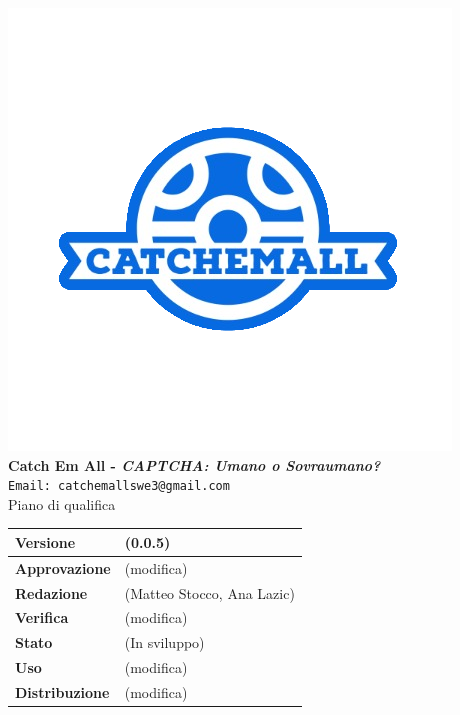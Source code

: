 \begin{titlepage}
\begin{center}
	\includegraphics[scale = 1.5]{img/logo.png}\\
	\bigskip
	\large \textbf{Catch Em All - \textit{CAPTCHA: Umano o Sovraumano?}}\\
	\texttt{Email: catchemallswe3@gmail.com}\\
	\vfill
	{\fontsize{1.5cm}{0}\selectfont Piano di qualifica}\\
	\vfill
	\begin{table}[h]
		\centering
		\setlength\extrarowheight{4pt}
		\begin{tabular}{| C{4.5cm} | C{4.5cm} |}
			\hline
			\textbf{Versione} & (0.0.5)\\
			\hline
			\textbf{Approvazione} & (modifica)\\
			\hline
			\textbf{Redazione} & (Matteo Stocco, Ana Lazic)\\
			\hline
			\textbf{Verifica} & (modifica)\\
			\hline
			\textbf{Stato} & (In sviluppo)\\
			\hline
			\textbf{Uso} & (modifica)\\
			\hline
			\textbf{Distribuzione} & (modifica)\\
			\hline
		\end{tabular}\\
	\end{table}
	
\end{center}
\end{titlepage}
